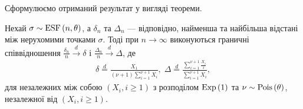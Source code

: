 Сформулюємо отриманий результат у вигляді теореми.
\begin{theorem}\label{th:spacing_limit}
    Нехай $\sigma \sim \mathrm{ESF}\left(n, \theta\right)$, а $\delta_n$ та $\Delta_n$ ---
    відповідно, найменша та найбільша відстані між нерухомими точками $\sigma$.
    Тоді при $n\to\infty$ виконуються граничні
    співвідношення
    $\frac{\delta_n}{n} \overset{d}{\longrightarrow} \delta$ і 
    $\frac{\Delta_n}{n} \overset{d}{\longrightarrow} \Delta$, де
    \begin{gather}
        \delta \overset{d}{=}
        \frac{X_1}{(\nu+1)\sum_{i=1}^{\nu+1} X_i}, \;
        \Delta \overset{d}{=} 
        \frac{\sum_{i=1}^{\nu+1} \frac{X_i}{i}}{\sum_{i=1}^{\nu+1} X_i},
    \end{gather}
    для незалежних між собою $\left(X_i, i \geq 1\right)$
    з розподілом $\mathrm{Exp}\left(1\right)$ та $\nu \sim \mathrm{Pois}\left(\theta\right)$,
    незалежної від $\left(X_i, i \geq 1\right)$.
\end{theorem}